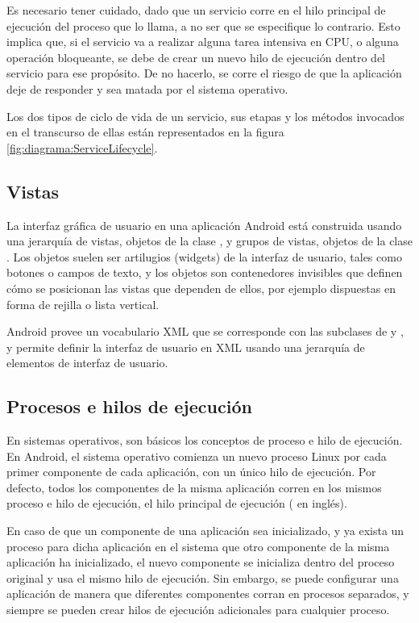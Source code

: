     Es necesario tener cuidado, dado que un servicio corre en el hilo principal de ejecución del proceso que lo llama, a no ser que se especifique lo contrario. Esto implica que, si el servicio va a realizar alguna tarea intensiva en CPU, o alguna operación bloqueante, se debe de crear un nuevo hilo de ejecución dentro del servicio para ese propósito. De no hacerlo, se corre el riesgo de que la aplicación deje de responder y sea matada por el sistema operativo.

    Los dos tipos de ciclo de vida de un servicio, sus etapas y los métodos invocados en el transcurso de ellas están representados en la figura \ref{fig:diagrama:ServiceLifecycle}.

\FloatBarrier
\subsection{Vistas}
La interfaz gráfica de usuario en una aplicación Android está construida usando una jerarquía de vistas, objetos de la clase , y grupos de vistas, objetos de la clase . Los objetos  suelen ser artilugios (widgets) de la interfaz de usuario, tales como botones o campos de texto, y los objetos  son contenedores invisibles que definen cómo se posicionan las vistas que dependen de ellos, por ejemplo dispuestas en forma de rejilla o lista vertical.

Android provee un vocabulario XML que se corresponde con las subclases de  y , y permite definir la interfaz de usuario en XML usando una jerarquía de elementos de interfaz de usuario.

\subsection{Procesos e hilos de ejecución}
    En sistemas operativos, son básicos los conceptos de proceso e hilo de ejecución. En Android, el sistema operativo comienza un nuevo proceso Linux por cada primer componente de cada aplicación, con un único hilo de ejecución. Por defecto, todos los componentes de la misma aplicación corren en los mismos proceso e hilo de ejecución, el hilo principal de ejecución ( en inglés). 

    En caso de que un componente de una aplicación sea inicializado, y ya exista un proceso para dicha aplicación en el sistema que otro componente de la misma aplicación ha inicializado, el nuevo componente se inicializa dentro del proceso original y usa el mismo hilo de ejecución. Sin embargo, se puede configurar una aplicación de manera que diferentes componentes corran en procesos separados, y siempre se pueden crear hilos de ejecución adicionales para cualquier proceso.

